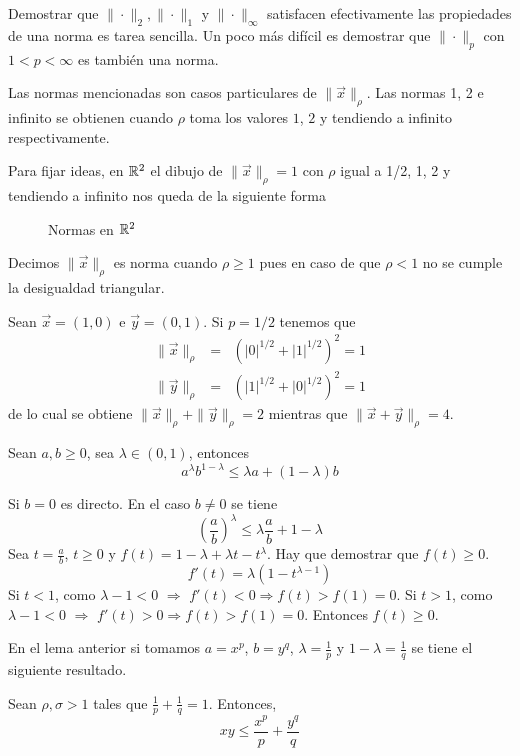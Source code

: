 Demostrar que $\|\cdot\|_2,\|\cdot\|_1$ y $\|\cdot\|_\infty$ satisfacen efectivamente las propiedades de una norma es tarea sencilla. Un poco m\'as dif\'icil es demostrar que $\|\cdot\|_p$ con $1<p<\infty$ es tambi\'en una norma.

Las normas mencionadas son casos particulares de $\|\vec{x}\|_\rho$. Las normas 1, 2 e infinito se obtienen cuando $\rho$ toma los valores $1$, $2$ y tendiendo a infinito respectivamente. 

\begin{ejemplo}\label{ejemplo-norma}
Para fijar ideas, en $\mathbb{R}^2$ el dibujo de $\|\vec{x}\|_\rho = 1$ con $\rho$ igual a 1/2, 1, 2 y tendiendo a infinito nos queda de la siguiente forma
\begin{figure}[H]
	\centering
	
	\caption{Normas en $\mathbb{R}^2$}
\end{figure}
Decimos $\|\vec{x}\|_\rho$ es norma cuando $\rho \geq 1$ pues en caso de que $\rho<1$ no se cumple la desigualdad triangular. 

Sean $\vec{x}=(1,0)$ e $\vec{y}=(0,1)$. Si $p=1/2$ tenemos que 
\begin{eqnarray*}
\|\vec{x}\|_\rho &=& (|0|^{1/2} + |1|^{1/2})^2 = 1 \\
\|\vec{y}\|_\rho &=& (|1|^{1/2} + |0|^{1/2})^2 = 1 
\end{eqnarray*}
de lo cual se obtiene $\|\vec{x}\|_\rho + \|\vec{y}\|_\rho = 2$ mientras que $\|\vec{x} + \vec{y}\|_\rho = 4$.
\end{ejemplo}

\begin{lema}
Sean $a, b \geq 0$, sea $\lambda \in (0,1)$, entonces
$$a^{\lambda} b^{1-\lambda} \leq \lambda a + (1-\lambda)b$$
\end{lema}

\begin{demostracion}
Si $b = 0$ es directo. En el caso $b \neq 0$ se tiene
$$\left( \frac{a}{b}\right)^{\lambda} \leq \lambda \frac{a}{b} + 1 - \lambda $$
Sea $t=\frac{a}{b}$, $t\geq 0$ y $f(t)=1-\lambda + \lambda t - t^{\lambda}$. Hay que demostrar que $f(t)\geq 0$.
$$f'(t) =  \lambda (1-t^{\lambda -1})$$
Si $t<1$, como $\lambda - 1 <0$ $\Rightarrow$ $f'(t) < 0 \Rightarrow f(t) > f(1) = 0$.
Si $t>1$, como $\lambda - 1 <0$ $\Rightarrow$ $f'(t) > 0 \Rightarrow f(t) > f(1) = 0$. 
 Entonces $f(t)\geq 0$.
\end{demostracion}

En el lema anterior si tomamos $a=x^p$, $b=y^{q}$, $\lambda = \frac{1}{p}$ y $1-\lambda = \frac{1}{q}$ se tiene el siguiente resultado.
\begin{lema}\label{lemautil}
Sean $\rho,\sigma>1$ tales que $\frac{1}{p}+\frac{1}{q}=1$. Entonces,
\begin{equation}
xy \leq \frac{x^p}{p} + \frac{y^q}{q}  \label{ecuacionconvexidad}
\end{equation}
\end{lema}

